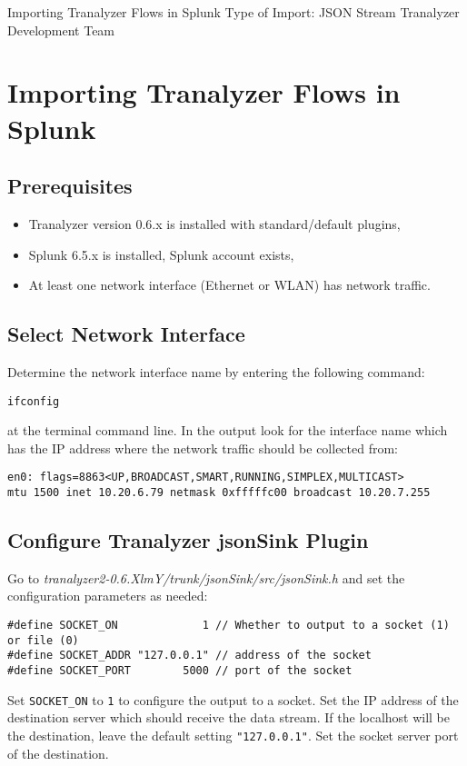 \documentclass[documentation]{subfiles}
\begin{document}
\trantitle
    {Importing Tranalyzer Flows in Splunk}
    {Type of Import: JSON Stream} %
    {Tranalyzer Development Team} %

\section{Importing Tranalyzer Flows in Splunk}\label{splunk_tutorial}

\subsection{Prerequisites}
\begin{itemize}
    \item Tranalyzer version 0.6.x is installed with standard/default plugins,
    \item Splunk 6.5.x is installed, Splunk account exists,
    \item At least one network interface (Ethernet or WLAN) has network traffic.
\end{itemize}

\subsection{Select Network Interface}

Determine the network interface name by entering the following command:
\begin{verbatim}
ifconfig
\end{verbatim}
at the terminal command line. In the output look for the interface
name which has the IP address where the network traffic should be
collected from:
\begin{verbatim}
en0: flags=8863<UP,BROADCAST,SMART,RUNNING,SIMPLEX,MULTICAST>
mtu 1500 inet 10.20.6.79 netmask 0xfffffc00 broadcast 10.20.7.255
\end{verbatim}

\subsection{Configure Tranalyzer jsonSink Plugin}

Go to {\em tranalyzer2-0.6.XlmY/trunk/jsonSink/src/jsonSink.h} and
set the configuration parameters as needed:
\begin{verbatim}
#define SOCKET_ON             1 // Whether to output to a socket (1) or file (0)
#define SOCKET_ADDR "127.0.0.1" // address of the socket
#define SOCKET_PORT        5000 // port of the socket
\end{verbatim}
Set {\tt SOCKET\_ON} to {\tt 1} to configure the output to a socket. Set the
IP address of the destination server which should receive the data
stream. If the localhost will be the destination, leave the default setting
{\tt "127.0.0.1"}. Set the socket server port of the destination.
\end{document}
